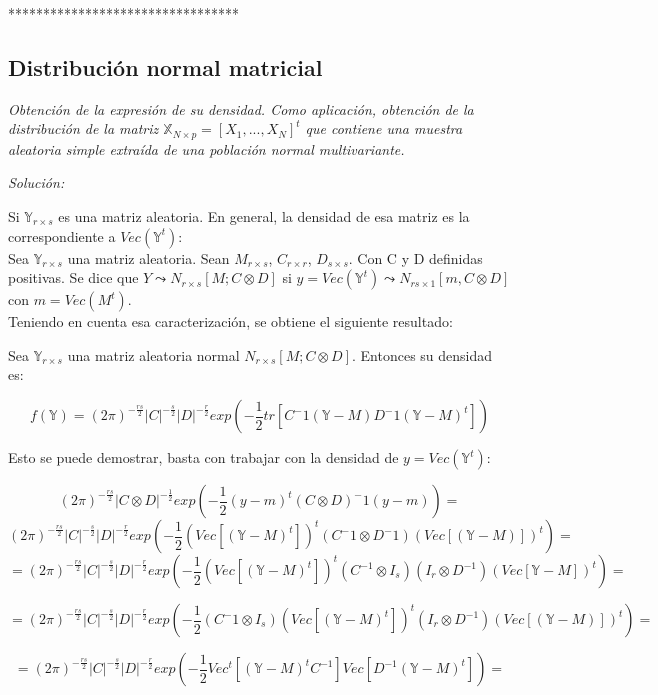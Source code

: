 \documentclass{article}
\theoremstyle{theorem-style}  %
\theoremstyle{definition-style}
\theoremstyle{example-style}
\theoremstyle{exercise-style}
\begin{document}
	*********************************
	
	\subsection{Distribución normal matricial}
	
	\textit{Obtención de la expresión de su densidad. Como aplicación, obtención de la distribución de la matriz $\mathbb{X}_{N \times p} = [X_1, ..., X_N]^t$ que contiene una muestra aleatoria simple extraída de una población normal multivariante.}
	
	\textit{Solución:}
	
	Si $\mathbb{Y}_{r\times s}$ es una matriz aleatoria. En general, la densidad de esa matriz es la correspondiente a $Vec(\mathbb{Y}^t)$: \\
	
	Sea $\mathbb{Y}_{r\times s}$ una matriz aleatoria. Sean $M_{r\times s}$, $C_{r\times r}$, $D_{s\times s}$. Con C y D definidas positivas. Se dice que $Y \leadsto N_{r \times s}[M;C\otimes D]$ si $y= Vec(\mathbb{Y}^t) \leadsto N_{rs\times 1}[m, C \otimes D]$ con $m=Vec(M^t)$. \\
	
	Teniendo en cuenta esa caracterización, se obtiene el siguiente resultado:
	
	Sea $\mathbb{Y}_{r\times s}$ una matriz aleatoria normal $N_{r\times s}[M; C \otimes D]$. Entonces su densidad es:
	
	$$f(\mathbb{Y}) = (2\pi)^{-\frac{rs}{2}}|C|^{-\frac{s}{2}}|D|^{-\frac{r}{2}}exp(-\frac{1}{2}tr[C^-1(\mathbb{Y}-M)D^-1(\mathbb{Y}-M)^t])$$
	
	Esto se puede demostrar, basta con trabajar con la densidad de $y=Vec(\mathbb{Y}^t)$:
	
	$$ (2\pi)^{-\frac{rs}{2}}|C\otimes D|^{-\frac{1}{2}} exp(-\frac{1}{2}(y-m)^t(C \otimes D)^-1(y-m)) = $$
	$$ (2\pi)^{-\frac{rs}{2}}|C|^{-\frac{s}{2}} |D|^{-\frac{r}{2}} exp(-\frac{1}{2}(Vec[(\mathbb{Y}-M)^t])^t(C^-1 \otimes D^-1)(Vec[(\mathbb{Y}-M)])^t) =$$
	$$ = (2\pi)^{-\frac{rs}{2}}|C|^{-\frac{s}{2}} |D|^{-\frac{r}{2}} exp(-\frac{1}{2}(Vec[(\mathbb{Y}-M)^t])^t(C^{-1} \otimes I_s)(I_r \otimes D^{-1})(Vec[\mathbb{Y}-M])^t) = $$
	
	$$=  (2\pi)^{-\frac{rs}{2}}|C|^{-\frac{s}{2}} |D|^{-\frac{r}{2}} exp(-\frac{1}{2} (C^-{1} \otimes I_s)(Vec[(\mathbb{Y}-M)^t])^t(I_r \otimes D^{-1})(Vec[(\mathbb{Y}-M)])^t) = $$
	
	$$ = (2\pi)^{-\frac{rs}{2}}|C|^{-\frac{s}{2}} |D|^{-\frac{r}{2}} exp(-\frac{1}{2} Vec^t[(\mathbb{Y}-M)^tC^{-1}]Vec[D^{-1}(\mathbb{Y}-M)^t]) = $$
\end{document}
